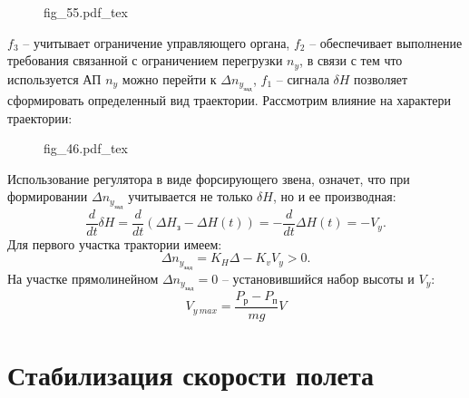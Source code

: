 \documentclass{article}
\newcommand{\incfig}[1]{
    {#1.pdf_tex}
}
\begin{document}
\begin{figure}[ht]
    \centering
    \incfig{fig_55}
    \label{fig:fig_55}
\end{figure}

$f_3$ -- учитывает ограничение управляющего органа, $f_2$ -- обеспечивает выполнение требования связанной с ограничением перегрузки $n_y$, в связи с тем что используется АП $n_y$ можно перейти к $ \Delta n_{y_{зад}}$, $f_1$ -- сигнала $\delta H$ позволяет сформировать определенный вид траектории. Рассмотрим влияние на характери траектории:

\begin{figure}[ht]
    \centering
    \incfig{fig_46}
    \label{fig:fig_46}
\end{figure}

Использование регулятора в виде форсирующего звена, означет, что при формировании $ \Delta n_{y_{зад}}$ учитывается не только $\delta H$, но и ее производная:
\[
    \frac{d}{dt} \delta H = \frac{d}{dt} (\Delta H_з - \Delta H (t)) = - \frac{d}{dt} \Delta H(t) = -V_y
.\]
Для первого участка трактории имеем:
\[
    \Delta n_{y_{зад}} = K_H \Delta - K_v V_y > 0
.\]
На участке прямолинейном $ \Delta n_{y_{зад}} = 0$ -- установившийся набор высоты и $V_y$:
\[
    V_{y \ max} = \frac{P_р - P_п}{mg}V
\]

\section{Стабилизация скорости полета}
\end{document}
